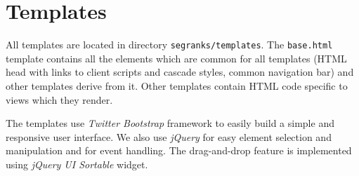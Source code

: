 \section{Templates}

All templates are located in directory \texttt{segranks/templates}. The
\texttt{base.html} template contains all the elements which are common for all
templates (HTML head with links to client scripts and cascade styles, common
navigation bar) and other templates derive from it. Other templates contain
HTML code specific to views which they render.

The templates use \textit{Twitter Bootstrap} framework to easily build a simple
and responsive user interface. We also use \textit{jQuery} for easy element
selection and manipulation and for event handling. The drag-and-drop feature is
implemented using \textit{jQuery UI Sortable} widget.




